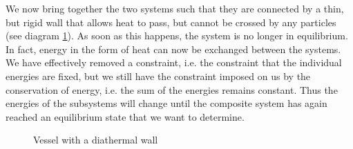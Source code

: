 \documentclass[a4paper, draft]{article}
\theoremstyle{own}
\theoremstyle{remark}
\begin{document}
We now bring together the two systems such that they are connected by a thin, but rigid wall that allows heat to pass, but cannot be crossed by any particles (see diagram \ref{fig:DiathermalWall}). As soon as this happens, the system is no longer in equilibrium. In fact, energy in the form of heat can now be exchanged between the systems. We have effectively removed a constraint, i.e. the constraint that the individual energies are fixed, but we still have the constraint imposed on us by the conservation of energy, i.e. the sum of the energies remains constant. Thus the energies of the subsystems will change until the composite system has again reached an equilibrium state that we want to determine.

\begin{figure}[ht]
	\begin{center}
		\caption{Vessel with a diathermal wall}
		\label{fig:DiathermalWall}
	\end{center}
\end{figure}
\end{document}
